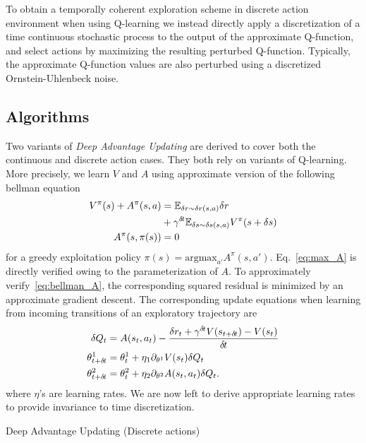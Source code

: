 To obtain a temporally coherent exploration scheme in discrete action environment
when using Q-learning we instead directly apply a discretization of a time continuous
stochastic process to the output of the approximate Q-function, and select actions
by maximizing the resulting perturbed Q-function. Typically, the approximate Q-function
values are also perturbed using a discretized Ornstein-Uhlenbeck noise.

\subsection{Algorithms}
\label{subsec:algorithm}
Two variants of \emph{Deep Advantage Updating} are derived to cover both the continuous
and discrete action cases. They both rely on variants of Q-learning. More precisely,
we learn $V$ and $A$ using approximate version of the following bellman equation
\begin{align}
	V^{\pi}(s) + A^{\pi}(s, a) &= \mathbb{E}_{\delta r \sim \delta r(s, a)}\delta r\nonumber\\ 
				   &+ \gamma^{\delta\hspace{-.1em}t}  \mathbb{E}_{\delta s \sim \delta s(s, a)} V^{\pi}(s + \delta s)\label{eq:bellman_A}\\
	A^{\pi}(s, \pi(s)) &= 0\label{eq:max_A}
\end{align}
for a greedy exploitation policy $\pi(s) = \text{argmax}_{a'}A^\pi(s, a')$.
Eq.~\eqref{eq:max_A} is directly verified owing to the parameterization of $A$.
To approximately verify~\eqref{eq:bellman_A}, the corresponding squared residual
is minimized by an approximate gradient descent.
The corresponding update equations when learning from incoming transitions of
an exploratory trajectory are
\begin{align}
	\delta Q_t &= A(s_t, a_t) - \frac{\delta r_t + \gamma^{\delta\hspace{-.1em}t} V(s_{t+\delta\hspace{-.1em}t}) - V(s_t)}{\delta\hspace{-.1em}t}\\
	\theta^1_{t+\delta\hspace{-.1em}t} &= \theta^1_t + \eta_1 \partial_{\theta^1} V(s_t) \delta Q_t\\
	\theta^2_{t+\delta\hspace{-.1em}t} &= \theta^2_t + \eta_2 \partial_{\theta^2} A(s_t, a_t) \delta Q_t.
	\label{eq:approx_bellman_A}
\end{align}
where $\eta$'s are learning rates. We are now left to derive appropriate learning rates
to provide invariance to time discretization.
\begin{algorithm}[ht]
	\caption{Deep Advantage Updating (Discrete actions)}
	
\end{algorithm}

